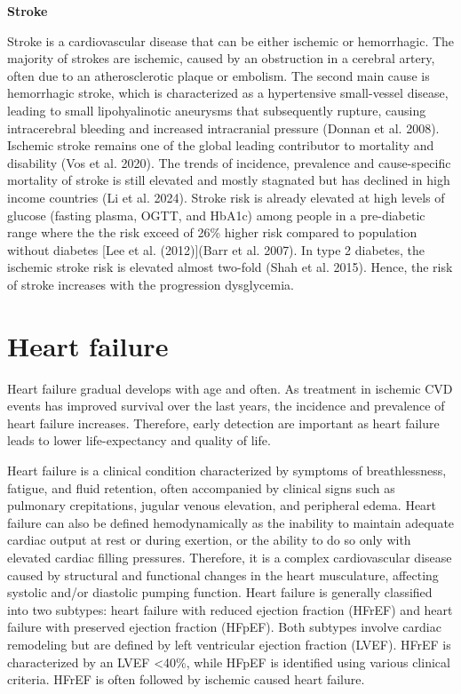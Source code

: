 \documentclass[
  a4paper,
  headsepline=true,
  open=any]{scrbook}
\begin{document}
\textbf{Stroke}

Stroke is a cardiovascular disease that can be either ischemic or
hemorrhagic. The majority of strokes are ischemic, caused by an
obstruction in a cerebral artery, often due to an atherosclerotic plaque
or embolism. The second main cause is hemorrhagic stroke, which is
characterized as a hypertensive small-vessel disease, leading to small
lipohyalinotic aneurysms that subsequently rupture, causing
intracerebral bleeding and increased intracranial pressure (Donnan et
al. 2008). Ischemic stroke remains one of the global leading contributor
to mortality and disability (Vos et al. 2020). The trends of incidence,
prevalence and cause-specific mortality of stroke is still elevated and
mostly stagnated but has declined in high income countries (Li et al.
2024). Stroke risk is already elevated at high levels of glucose
(fasting plasma, OGTT, and HbA1c) among people in a pre-diabetic range
where the the risk exceed of 26\% higher risk compared to population
without diabetes {[}Lee et al. (2012){]}(Barr et al. 2007). In type 2
diabetes, the ischemic stroke risk is elevated almost two-fold (Shah et
al. 2015). Hence, the risk of stroke increases with the progression
dysglycemia.

\hypertarget{heart-failure}{%
\section{Heart failure}\label{heart-failure}}

Heart failure gradual develops with age and often. As treatment in
ischemic CVD events has improved survival over the last years, the
incidence and prevalence of heart failure increases. Therefore, early
detection are important as heart failure leads to lower life-expectancy
and quality of life.

Heart failure is a clinical condition characterized by symptoms of
breathlessness, fatigue, and fluid retention, often accompanied by
clinical signs such as pulmonary crepitations, jugular venous elevation,
and peripheral edema. Heart failure can also be defined hemodynamically
as the inability to maintain adequate cardiac output at rest or during
exertion, or the ability to do so only with elevated cardiac filling
pressures. Therefore, it is a complex cardiovascular disease caused by
structural and functional changes in the heart musculature, affecting
systolic and/or diastolic pumping function. Heart failure is generally
classified into two subtypes: heart failure with reduced ejection
fraction (HFrEF) and heart failure with preserved ejection fraction
(HFpEF). Both subtypes involve cardiac remodeling but are defined by
left ventricular ejection fraction (LVEF). HFrEF is characterized by an
LVEF \textless40\%, while HFpEF is identified using various clinical
criteria. HFrEF is often followed by ischemic caused heart failure.
\end{document}
